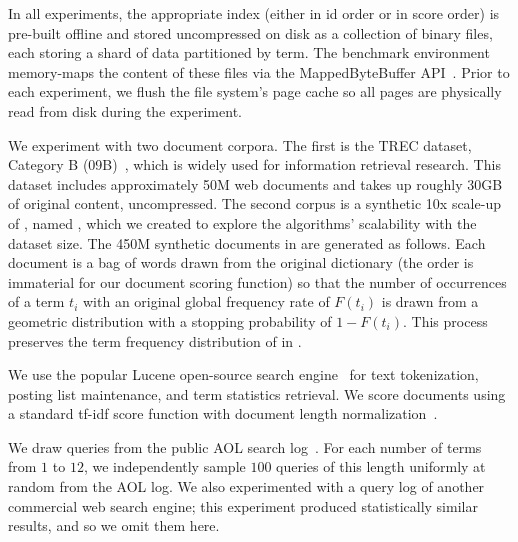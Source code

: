 In all experiments, the appropriate index (either in id order or in score order)
is pre-built offline and stored uncompressed on disk as a collection of binary files, 
each storing a shard of data partitioned by term.  The benchmark environment memory-maps the content 
of these files via the MappedByteBuffer API~\cite{java-hashmap}.
Prior to each experiment, we flush the file system's page cache so all pages are physically read from disk during the experiment.

We  experiment with two document corpora. The first  is the TREC {\cw\/} dataset, 
Category B ({\cw}09B)~\cite{ClueWeb09}, which is widely used for information retrieval research. This dataset includes approximately 50M web documents and takes up roughly 30GB of original content, uncompressed.
The second corpus is a synthetic 10x scale-up of \cw, named \cwten, which we created to explore the algorithms' scalability 
with the dataset size. 
The 450M synthetic documents in {\cwten\/} are generated as follows. Each document is a bag of words drawn from the original {\cw\/} dictionary 
(the order is immaterial for our document scoring function) 
so that the number of occurrences of a term $t_i$ with an original 
global frequency rate of $F(t_i)$ is drawn from a geometric distribution with a stopping probability of $1-F(t_i)$. This  process preserves 
the  term frequency distribution of {\cw\/} in \cwten.
 
We use the popular Lucene open-source search engine~\cite{lucene} for text tokenization, posting list maintenance, 
and term statistics retrieval.
We score documents using 
a standard tf-idf score function with document length normalization~\cite{Baeza-Yates:1999:MIR:553876}. 

We draw queries from the public AOL search log~\cite{aol}.
For each number of terms from $1$ to $12$, we independently sample $100$ queries of this length uniformly at random from the AOL log.
We also  experimented with a query log of another commercial web search engine; this experiment  
produced statistically similar results, and so we omit them here.  

